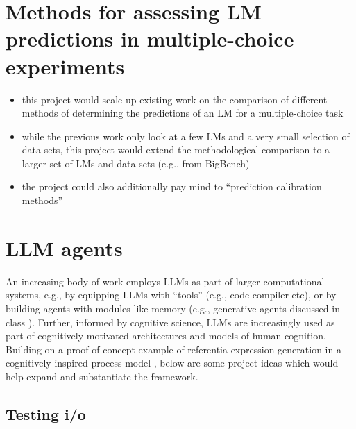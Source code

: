 \documentclass[fleqn,reqno,10pt]{article}
\begin{document}
\section{Methods for assessing LM predictions in multiple-choice experiments}

\begin{itemize}
  \item this project would scale up existing work on the comparison of different methods of determining the predictions of an LM for a multiple-choice task \citep{TsvilodubWang2024:Predictions-fro}
  \item while the previous work only look at a few LMs and a very small selection of data sets, this project would extend the methodological comparison to a larger set of LMs and data sets (e.g., from BigBench)
  \item the project could also additionally pay mind to ``prediction calibration methods'' \citep{ZhaoWallace2021:Calibrate-Befor,HoltzmanWest2021:Surface-Form-Co}
\end{itemize}

\section{LLM agents}

An increasing body of work employs LLMs as part of larger computational systems, e.g., by equipping LLMs with ``tools'' (e.g., code compiler etc), or by building agents with modules like memory (e.g., generative agents discussed in class \citep{park2023generative}). 
Further, informed by cognitive science, LLMs are increasingly used as part of cognitively motivated architectures and models of human cognition. 
Building on a proof-of-concept example of referentia expression generation in a cognitively inspired process model \citep{tsvilodub2024cognitivemodelingscaffoldedllms}, below are some project ideas which would help expand and substantiate the framework.

\subsection{Testing i/o}

\end{document}
